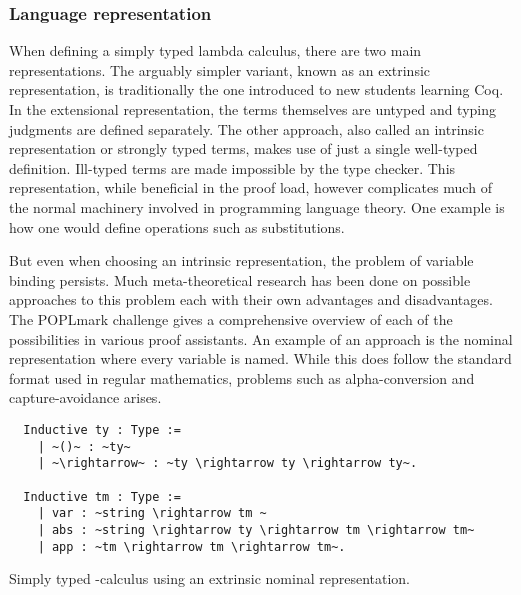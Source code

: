 \documentclass[a4, 12pt, final]{article}
\begin{document}
\subsubsection{Language representation}

When defining a simply typed lambda calculus, there are two main representations.
The arguably simpler variant, known as an extrinsic representation, is traditionally the one introduced to new students learning Coq.
In the extensional representation, the terms themselves are untyped and typing judgments are defined separately.
The other approach, also called an intrinsic representation or strongly typed terms, makes use of just a single well-typed definition.
Ill-typed terms are made impossible by the type checker.
This representation, while beneficial in the proof load, however complicates much of the normal machinery involved in programming language theory.
One example is how one would define operations such as substitutions.

But even when choosing an intrinsic representation, the problem of variable binding persists.
Much meta-theoretical research has been done on possible approaches to this problem each with their own advantages and disadvantages.
The POPLmark challenge gives a comprehensive overview of each of the possibilities in various proof assistants\cite{Aydemir2005}.
An example of an approach is the nominal representation where every variable is named.
While this does follow the standard format used in regular mathematics, problems such as alpha-conversion and capture-avoidance arises.

\begin{listing}
  \begin{verbatim}
  Inductive ty : Type :=
    | ~()~ : ~ty~
    | ~\rightarrow~ : ~ty \rightarrow ty \rightarrow ty~.

  Inductive tm : Type :=
    | var : ~string \rightarrow tm ~
    | abs : ~string \rightarrow ty \rightarrow tm \rightarrow tm~
    | app : ~tm \rightarrow tm \rightarrow tm~.
  \end{verbatim}
  \caption{Simply typed \lambda-calculus using an extrinsic nominal representation.}
  \label{lst:nominal_stlc}
\end{listing}
\end{document}
